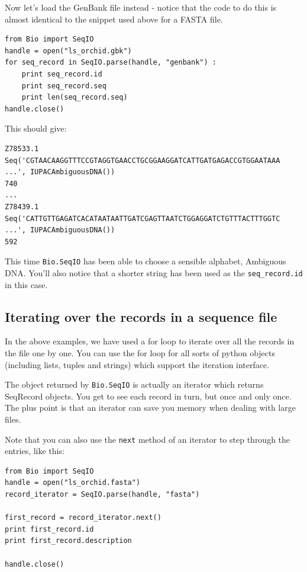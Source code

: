 \documentclass{report}
\begin{document}
Now let's load the GenBank file instead - notice that the code to do this is almost identical to the snippet used above for a FASTA file.

\begin{verbatim}
from Bio import SeqIO
handle = open("ls_orchid.gbk")
for seq_record in SeqIO.parse(handle, "genbank") :
    print seq_record.id
    print seq_record.seq
    print len(seq_record.seq)
handle.close()
\end{verbatim}

\noindent This should give:

\begin{verbatim}
Z78533.1
Seq('CGTAACAAGGTTTCCGTAGGTGAACCTGCGGAAGGATCATTGATGAGACCGTGGAATAAA ...', IUPACAmbiguousDNA())
740
...
Z78439.1
Seq('CATTGTTGAGATCACATAATAATTGATCGAGTTAATCTGGAGGATCTGTTTACTTTGGTC ...', IUPACAmbiguousDNA())
592
\end{verbatim}

This time \verb|Bio.SeqIO| has been able to choose a sensible alphabet, Ambiguous DNA.  You'll also notice that a shorter string has been used as the \verb|seq_record.id| in this case.

\subsection{Iterating over the records in a sequence file}

In the above examples, we have used a for loop to iterate over all the records in the file one by one.  You can use the for loop for all sorts of python objects (including lists, tuples and strings) which support the iteration interface.

The object returned by \verb|Bio.SeqIO| is actually an iterator which returns SeqRecord objects.  You get to see each record in turn, but once and only once.  The plus point is that an iterator can save you memory when dealing with large files.

Note that you can also use the \verb|next| method of an iterator to step through the entries, like this:

\begin{verbatim}
from Bio import SeqIO
handle = open("ls_orchid.fasta")
record_iterator = SeqIO.parse(handle, "fasta")

first_record = record_iterator.next()
print first_record.id
print first_record.description

handle.close()
\end{verbatim}
\end{document}
